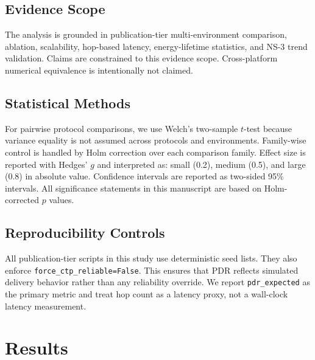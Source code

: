 ﻿\documentclass[sensors,article,submit,moreauthors,pdftex]{Definitions/mdpi}
\begin{document}
\subsection{Evidence Scope}
The analysis is grounded in publication-tier multi-environment comparison, ablation, scalability, hop-based latency, energy-lifetime statistics, and NS-3 trend validation. Claims are constrained to this evidence scope. Cross-platform numerical equivalence is intentionally not claimed.

\subsection{Statistical Methods}
For pairwise protocol comparisons, we use Welch's two-sample $t$-test because variance equality is not assumed across protocols and environments. Family-wise control is handled by Holm correction over each comparison family. Effect size is reported with Hedges' $g$ and interpreted as: small (0.2), medium (0.5), and large (0.8) in absolute value. Confidence intervals are reported as two-sided 95\% intervals. All significance statements in this manuscript are based on Holm-corrected $p$ values.

\subsection{Reproducibility Controls}
All publication-tier scripts in this study use deterministic seed lists. They also enforce \texttt{force\_ctp\_reliable=False}. This ensures that PDR reflects simulated delivery behavior rather than any reliability override. We report \texttt{pdr\_expected} as the primary metric and treat hop count as a latency proxy, not a wall-clock latency measurement.

\section{Results}
\end{document}
